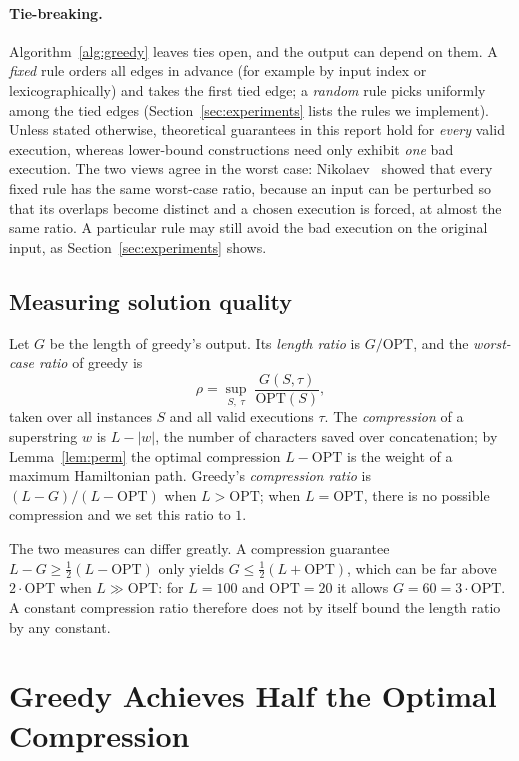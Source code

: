 \documentclass[11pt,a4paper]{article}   %
\theoremstyle{compact}
\theoremstyle{compactdef}
\newcommand{\OPT}{\mathrm{OPT}}
\newcommand{\GR}{G}                         %
\begin{document}
\paragraph{Tie-breaking.}
Algorithm~\ref{alg:greedy} leaves ties open, and the output can depend on
them. A \emph{fixed} rule orders all edges in advance (for example by input
index or lexicographically) and takes the first tied edge; a \emph{random}
rule picks uniformly among the tied edges (Section~\ref{sec:experiments}
lists the rules we implement). Unless stated otherwise, theoretical
guarantees in this report hold for \emph{every} valid execution, whereas
lower-bound constructions need only exhibit \emph{one} bad execution.
The two views agree in the worst case: Nikolaev~\cite{Nik21} showed that
every fixed rule has the same worst-case ratio, because an input can be
perturbed so that its overlaps become distinct and a chosen execution is
forced, at almost the same ratio. A particular rule may still avoid the bad
execution on the original input, as Section~\ref{sec:experiments} shows.

\subsection{Measuring solution quality}

Let $\GR$ be the length of greedy's output. Its \emph{length ratio} is
$\GR/\OPT$, and the \emph{worst-case ratio} of greedy is
\[
  \rho=\sup_{S,\;\tau}\;\frac{\GR(S,\tau)}{\OPT(S)},
\]
taken over all instances $S$ and all valid executions $\tau$. The
\emph{compression} of a superstring $w$ is $L-|w|$, the number of
characters saved over concatenation; by Lemma~\ref{lem:perm} the optimal
compression $L-\OPT$ is the weight of a maximum Hamiltonian path. Greedy's
\emph{compression ratio} is $(L-\GR)/(L-\OPT)$ when $L>\OPT$;
when $L=\OPT$, there is no possible compression and we set this ratio to $1$.

The two measures can differ greatly. A compression guarantee
$L-\GR\ge\frac12(L-\OPT)$ only yields $\GR\le\frac12(L+\OPT)$, which can be
far above $2\cdot\OPT$ when $L\gg\OPT$: for $L=100$ and $\OPT=20$ it allows
$\GR=60=3\cdot\OPT$. A constant compression ratio therefore does not by
itself bound the length ratio by any constant.

\section{Greedy Achieves Half the Optimal Compression}\label{sec:compression}
\end{document}
